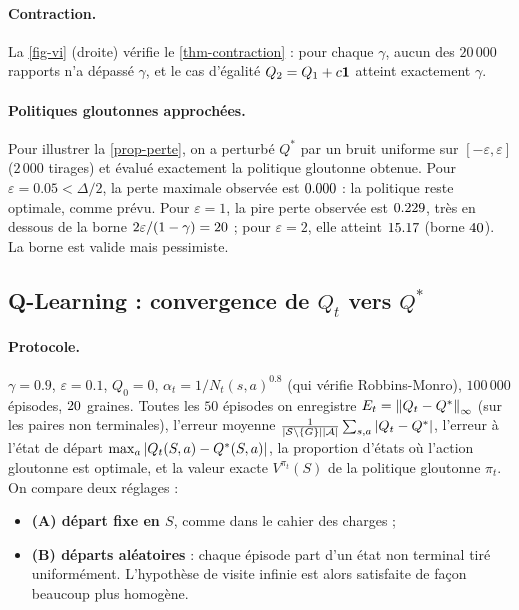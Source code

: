 \paragraph{Contraction.} La \cref{fig-vi} (droite) vérifie le \cref{thm-contraction} : pour chaque $\gamma$, aucun des $20\,000$ rapports n'a dépassé $\gamma$, et le cas d'égalité $Q_2=Q_1+c\mathbf{1}$ atteint exactement $\gamma$.

\paragraph{Politiques gloutonnes approchées.} Pour illustrer la \cref{prop-perte}, on a perturbé $Q^*$ par un bruit uniforme sur $[-\varepsilon,\varepsilon]$ ($2\,000$ tirages) et évalué exactement la politique gloutonne obtenue. Pour $\varepsilon=0.05<\Delta/2$, la perte maximale observée est $0.000$ : la politique reste optimale, comme prévu. Pour $\varepsilon=1$, la pire perte observée est $0.229$, très en dessous de la borne $2\varepsilon/(1-\gamma)=20$ ; pour $\varepsilon=2$, elle atteint $15.17$ (borne $40$). La borne est valide mais pessimiste.

\FloatBarrier
\subsection{Q-Learning : convergence de \texorpdfstring{$Q_t$}{Qt} vers \texorpdfstring{$Q^*$}{Q*}}\label{sec-exp-main}

\paragraph{Protocole.} $\gamma=0.9$, $\varepsilon=0.1$, $Q_0=0$, $\alpha_t=1/N_t(s,a)^{0.8}$ (qui vérifie Robbins-Monro), $100\,000$ épisodes, $20$ graines. Toutes les $50$ épisodes on enregistre $E_t=\left\lVert Q_t-Q^* \right\rVert_\infty$ (sur les paires non terminales), l'erreur moyenne $\frac{1}{|\mathcal{S}\setminus\{G\}||\mathcal{A}|}\sum_{s,a}\left\lvert Q_t-Q^* \right\rvert$, l'erreur à l'état de départ $\max_a\left\lvert Q_t(S,a)-Q^*(S,a) \right\rvert$, la proportion d'états où l'action gloutonne est optimale, et la valeur exacte $V^{\pi_t}(S)$ de la politique gloutonne $\pi_t$. On compare deux réglages :
\begin{itemize}
\item \textbf{(A) départ fixe en $S$}, comme dans le cahier des charges ;
\item \textbf{(B) départs aléatoires} : chaque épisode part d'un état non terminal tiré uniformément. L'hypothèse de visite infinie est alors satisfaite de façon beaucoup plus homogène.
\end{itemize}

